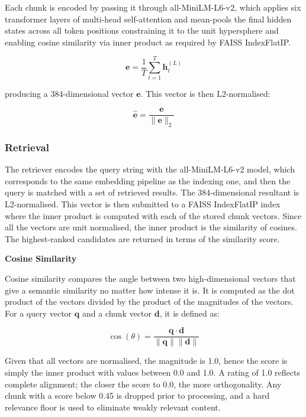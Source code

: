 Each chunk is encoded by passing it through all-MiniLM-L6-v2, which applies six transformer layers of multi-head self-attention and mean-pools the final hidden states across all token positions constraining it to the unit hypersphere and enabling cosine similarity via inner product as required by FAISS IndexFlatIP. 

\begin{equation}
    \mathbf{e} = \frac{1}{T} \sum_{t=1}^{T} \mathbf{h}_t^{(L)}
\end{equation}

producing a 384-dimensional vector $\mathbf{e}$. This vector is then L2-normalised:

\begin{equation}
    \hat{\mathbf{e}} = \frac{\mathbf{e}}{\|\mathbf{e}\|_2}
\end{equation}


\subsubsection{Retrieval}

The retriever encodes the query string with the all-MiniLM-L6-v2 model, which corresponds to the same embedding pipeline as the indexing one, and then the query is matched with a set of retrieved results. The 384-dimensional resultant is L2-normalised. This vector is then submitted to a FAISS IndexFlatIP index where the inner product is computed with each of the stored chunk vectors. Since all the vectors are unit normalised, the inner product is the similarity of cosines. The highest-ranked candidates are returned in terms of the similarity score.

\textbf{Cosine Similarity}

Cosine similarity compares the angle between two high-dimensional vectors that give a semantic similarity no matter how intense it is. It is computed as the dot product of the vectors divided by the product of the magnitudes of the vectors. For a query vector $\mathbf{q}$ and a chunk vector $\mathbf{d}$, it is defined as:

\begin{equation}
    \cos(\theta) = \frac{\mathbf{q} \cdot \mathbf{d}}{\|\mathbf{q}\| \|\mathbf{d}\|}
\end{equation}

Given that all vectors are normalised, the magnitude is 1.0, hence the score is simply the inner product with values between 0.0 and 1.0. A rating of 1.0 reflects complete alignment; the closer the score to 0.0, the more orthogonality. Any chunk with a score below 0.45 is dropped prior to processing, and a hard relevance floor is used to eliminate weakly relevant content.

